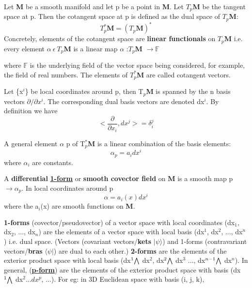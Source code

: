 Let  \textbf{M} be a smooth manifold and let  p be a point in \textbf{M}. 
Let  $T_{p}$\textbf{M} be the tangent space at p. 
Then the cotangent space at p is defined as the dual space of $T_{p}$\textbf{M}:
\begin{equation}
    T_{p}^{*}\textbf{M} = (T_{p}\textbf{M})^{*}
\end{equation}
Concretely, elements of the cotangent space are \textbf{linear functionals} on 
$T_{p}$\textbf{M} i.e. every element $\alpha \: \epsilon \: T_p$\textbf{M} is a linear map
$\alpha$ :$T_{p}$\textbf{M} $\rightarrow \mathbb{F}$

where $\mathbb{F}$ is the underlying field of the vector space being considered, for example, the field of real numbers. 
The elements of $T_{p}^{*}$\textbf{M} are called cotangent vectors.

Let \{x$^i$\} be local coordinates  around p, then T$_p$\textbf{M} is spanned by the n basis vectors $\partial/\partial x^i$. The
corresponding dual basis vectors are denoted dx$^i$. By definition we have
\begin{equation}
    \Bigg< \frac{\partial}{\partial x_i}, dx^j\Bigg> = \delta_i^j
\end{equation}

A general element $\alpha$ p of T$_p^*$\textbf{M} is a linear combination of
the basis elements:
\begin{equation}
    \alpha_p = a_i dx^i
\end{equation}
where $\alpha_i$ are constants.

A \textbf{differential} \href{https://mathworld.wolfram.com/One-Form.html}{\textbf{1-form}} or \textbf{smooth covector field}
on \textbf{M} is a smooth map p$\rightarrow \alpha_p$. In local coordinates around p 
\begin{equation}
    \alpha = a_i(x)dx^i
\end{equation}
where the a$_i$(x) are smooth functions on \textbf{M}.

\textbf{1-forms} (covector/pseudovector) of a vector space with local coordinates (dx$_1$, dx$_2$, ..., dx$_n$)
are the elements of a vector space with local basis (dx$^1$, dx$^2$, ..., dx$^n$) i.e. dual space.
(Vectors (covariant vectors/\textbf{kets} $|\psi \rangle$) and 1-forms (contravariant vectors/\textbf{bras} $\langle \psi |$) are dual to each other.)
\textbf{2-forms} are the elements of the exterior product space with local basis (dx$^1 \exterior$ dx$^2$, dx$^2 \exterior$ dx$^3$ ..., dx$^{n-1} \exterior$ dx$^n$).
In general, (\href{https://www.physicsforums.com/threads/what-is-2-form.762846/#:~:text=The%201%2Dforms%20(or%20covectors,the%20bases%20may%20be%20omitted.}{\textbf{p-form}})
are the elements of the exterior product space with basis (dx$^1 \exterior$ dx$^2 ... dx^p$, ...). For eg:
in 3D Euclidean space with basis (i, j, k), 

